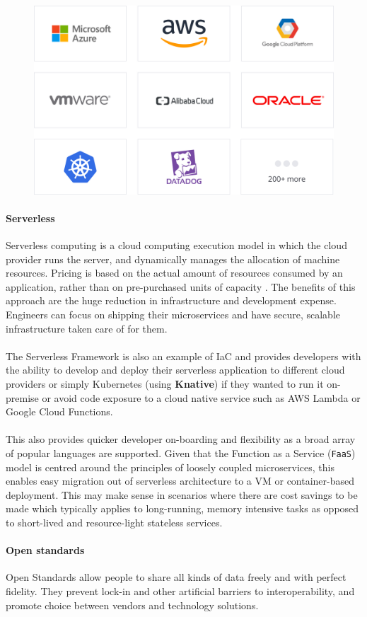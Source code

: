\documentclass[10pt]{article}
\begin{document}
\begin{figure}[h!]
	\centering
	\includegraphics[width=0.55\linewidth]{images/TerraformProviders.png}	
\end{figure}

\paragraph{Serverless}
Serverless computing is a cloud computing execution model in which the cloud provider runs the server, and dynamically manages the allocation of machine resources. Pricing is based on the actual amount of resources consumed by an application, rather than on pre-purchased units of capacity \cite{serverless}. The benefits of this approach are the huge reduction in infrastructure and development expense. Engineers can focus on shipping their microservices and have secure, scalable infrastructure taken care of for them.
\\ \\
The Serverless Framework is also an example of IaC and provides developers with the ability to develop and deploy their serverless application to different cloud providers or simply Kubernetes (using \textbf{Knative}) if they wanted to run it on-premise or avoid code exposure to a cloud native service such as AWS Lambda or Google Cloud Functions.
\\ \\
This also provides quicker developer on-boarding and flexibility as a broad array of popular languages are supported. Given that the Function as a Service (\texttt{FaaS}) model is centred around the principles of loosely coupled microservices, this enables easy migration out of serverless architecture to a VM or container-based deployment. This may make sense in scenarios where there are cost savings to be made which typically applies to long-running, memory intensive tasks as opposed to short-lived and resource-light stateless services.


\paragraph{Open standards}
Open Standards allow people to share all kinds of data freely and with perfect fidelity. They prevent lock-in and other artificial barriers to interoperability, and promote choice between vendors and technology solutions. \cite{openstandards}
\end{document}
